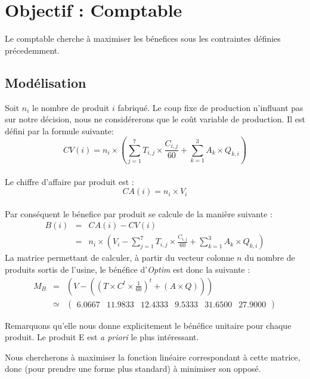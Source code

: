\newpage
\section{Objectif : Comptable}
Le comptable cherche à maximiser les bénefices sous les contraintes définies
précedemment.

\subsection{Modélisation}
Soit $n_i$ le nombre de produit $i$ fabriqué. Le coup fixe de production
n'influant pas sur notre décision, nous ne considérerons que le coût variable de
production. Il est défini par la formule suivante:
\begin{displaymath}
CV(i) = n_i \times \left (\sum_{j = 1}^{7} T_{i,j} \times 
\frac{C_{i,j}}{60} + \sum_{k = 1}^{3} A_{k} \times Q_{k,i} \right )
\end{displaymath}
~\\
Le chiffre d'affaire par produit est :
\begin{displaymath}
CA(i) = n_i \times V_i
\end{displaymath}
~\\
Par conséquent le bénefice par produit se calcule de la manière suivante :
\begin{eqnarray*}
	B(i) &=& CA(i) - CV(i)\\
		&=& n_i  \times \left (V_i - \sum_{j = 1}^{7} T_{i,j} \times \frac{C_{i,j}}{60} +
	\sum_{k = 1}^{3} A_{k} \times Q_{k,i} \right )
\end{eqnarray*}
La matrice permettant de calculer, à partir du vecteur colonne $n$ du nombre de produits sortis de l'usine, le bénéfice d'\emph{Optim} est donc la suivante :
\begin{eqnarray*}
	M_{B} &=&  \left(V - \left( \left(T \times C^{t} \times \frac{1}{60} \right)^{t} + \left(A \times Q\right) \right)\right) \\
		&\simeq& \begin{pmatrix} 6.0667 & 11.9833 & 12.4333 & 9.5333 & 31.6500 & 27.9000 \end{pmatrix}
\end{eqnarray*}

Remarquons qu'elle nous donne explicitement le bénéfice unitaire pour chaque produit. Le produit E est \emph{a priori} le plus intéressant.

Nous chercherons à maximiser la fonction linéaire correspondant à cette matrice, donc (pour prendre une forme plus standard) à minimiser son opposé.


